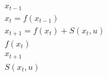 \documentclass{article}
\begin{document}
\begin{gather*}
    x_{t-1}\\
    x_{t} = f(x_{t-1})\\
    x_{t+1} = f(x_{t}) + S(x_t, u)\\
    f(x_{t})\\
    x_{t+1}\\
    S(x_{t}, u)\\
\end{gather*}
\end{document}

